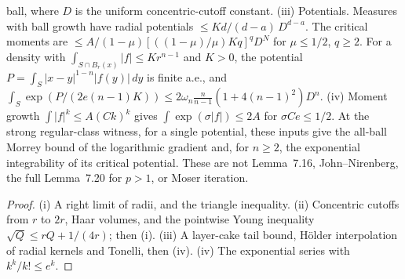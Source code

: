 \begin{lemma}
  ball, where $D$ is the uniform concentric-cutoff constant.
  (iii) Potentials. Measures with ball growth have radial potentials $\le Kd/(d-a)\,D^{d-a}$. The critical moments are
  $\le A/(1-\mu)[((1-\mu)/\mu)Kq]^qD^N$ for $\mu\le1/2$, $q\ge2$. For a density with
  $\int_{S\cap B_r(x)}|f|\le Kr^{n-1}$ and $K>0$, the potential $P=\int_S|x-y|^{1-n}|f(y)|\,dy$ is finite a.e., and
  $\int_S\exp(P/(2e(n-1)K))\le2\omega_n\frac n{n-1}(1+4(n-1)^2)D^n$.
  (iv) Moment growth $\int|f|^k\le A(Ck)^k$ gives $\int\exp(\sigma|f|)\le2A$ for $\sigma Ce\le1/2$.
  At the strong regular-class witness, for a single potential, these inputs give the all-ball Morrey bound of the logarithmic
  gradient and, for $n\ge2$, the exponential integrability of its critical potential.
  These are not Lemma~7.16, John--Nirenberg, the full Lemma~7.20 for $p>1$, or Moser iteration.
\end{lemma}
\begin{proof}
  \leanok
  (i) A right limit of radii, and the triangle inequality.
  (ii) Concentric cutoffs from $r$ to $2r$, Haar volumes, and the pointwise Young inequality $\sqrt Q\le rQ+1/(4r)$; then (i).
  (iii) A layer-cake tail bound, H\"older interpolation of radial kernels and Tonelli, then (iv).
  (iv) The exponential series with $k^k/k!\le e^k$.
\end{proof}

